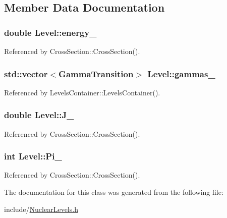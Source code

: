 \subsection{Member Data Documentation}
\hypertarget{classLevel_ad7a1c3e9c9af88945e4d80016251cdaf}{
\subsubsection[{energy\-\_\-}]{\setlength{\rightskip}{0pt plus 5cm}double Level\-::energy\-\_\-}}\label{classLevel_ad7a1c3e9c9af88945e4d80016251cdaf}


Referenced by Cross\-Section\-::\-Cross\-Section().

\hypertarget{classLevel_a11037583b37641411f0811740053ed33}{
\subsubsection[{gammas\-\_\-}]{\setlength{\rightskip}{0pt plus 5cm}std\-::vector$<${\bf Gamma\-Transition}$>$ Level\-::gammas\-\_\-}}\label{classLevel_a11037583b37641411f0811740053ed33}


Referenced by Levels\-Container\-::\-Levels\-Container().

\hypertarget{classLevel_aa0a9158f0edaed1fedd27f310db4d344}{
\subsubsection[{J\-\_\-}]{\setlength{\rightskip}{0pt plus 5cm}double Level\-::\-J\-\_\-}}\label{classLevel_aa0a9158f0edaed1fedd27f310db4d344}


Referenced by Cross\-Section\-::\-Cross\-Section().

\hypertarget{classLevel_a3cee365520b4879a70dfb4362fe59fe3}{
\subsubsection[{Pi\-\_\-}]{\setlength{\rightskip}{0pt plus 5cm}int Level\-::\-Pi\-\_\-}}\label{classLevel_a3cee365520b4879a70dfb4362fe59fe3}


Referenced by Cross\-Section\-::\-Cross\-Section().



The documentation for this class was generated from the following file\-:\begin{DoxyCompactItemize}
\item 
include/\hyperlink{NuclearLevels_8h}{Nuclear\-Levels.\-h}\end{DoxyCompactItemize}
